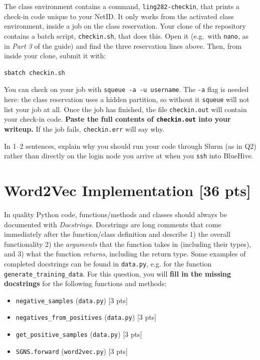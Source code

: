 \documentclass[11pt]{article}
\begin{document}
 The class environment contains a command, \texttt{ling282-checkin}, that prints a check-in code unique to your NetID. It only works from the activated class environment, inside a job on the class reservation. Your clone of the repository contains a batch script, \texttt{checkin.sh}, that does this. Open it (e.g.\ with \texttt{nano}, as in \textit{Part 3} of the guide) and find the three reservation lines above. Then, from inside your clone, submit it with:
\begin{verbatim}
sbatch checkin.sh
\end{verbatim}
You can check on your job with \texttt{squeue -a -u username}. The \texttt{-a} flag is needed here: the class reservation uses a hidden partition, so without it \texttt{squeue} will not list your job at all.
Once the job has finished, the file \texttt{checkin.out} will contain your check-in code. \textbf{Paste the full contents of \texttt{checkin.out} into your writeup.} If the job fails, \texttt{checkin.err} will say why.

\vspace{2em}
 In 1--2 sentences, explain why you should run your code through Slurm (as in Q2) rather than directly on the login node you arrive at when you \texttt{ssh} into BlueHive.

\newpage
\section{Word2Vec Implementation [36 pts]}
 In quality Python code, functions/methods and classes should always be documented with \textit{Docstrings}. Docstrings are long comments that come immediately after the function/class definition and describe 1) the overall functionality 2) the \textit{arguments} that the function takes in (including their types), and 3) what the function \textit{returns}, including the return type. Some examples of completed docstrings can be found in \texttt{data.py}, e.g. for the function \texttt{generate\_training\_data}. For this question, you will \textbf{fill in the missing docstrings} for the following functions and methods:

\begin{itemize}
  \item \texttt{negative\_samples} (\texttt{data.py}) [3 pts]
  \item \texttt{negatives\_from\_positives} (\texttt{data.py}) [3 pts]
  \item \texttt{get\_positive\_samples} (\texttt{data.py}) [3 pts]
  \item \texttt{SGNS.forward} (\texttt{word2vec.py}) [3 pts]
\end{itemize}
\end{document}
